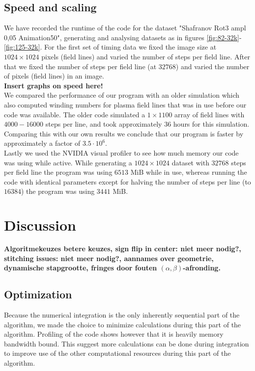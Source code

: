 \documentclass{article}
\begin{document}
\subsection{Speed and scaling}
We have recorded the runtime of the code for the dataset "Shafranov Rot3 ampl 0,05 Animation50", generating and analysing datasets as in figures \ref{fig:82-32k}-\ref{fig:125-32k}. For the first set of timing data we fixed the image size at $1024\times 1024$ pixels (field lines) and varied the number of steps per field line. After that we fixed the number of steps per field line (at $32768$) and varied the number of pixels (field lines) in an image.\\

\textbf{Insert graphs on speed here!}\\

We compared the performance of our program with an older simulation which also computed winding numbers for plasma field lines that was in use before our code was available. The older code simulated a $1\times 1100$ array of field lines with $4000-16000$ steps per line, and took approximately $36$ hours for this simulation. Comparing this with our own results we conclude that our program is faster by approximately a factor of $3.5\cdot 10^6$.\\

Lastly we used the NVIDIA visual profiler to see how much memory our code was using while active. While generating a $1024\times 1024$ dataset with $32768$ steps per field line the program was using $6513$ MiB while in use, whereas running the code with identical parameters except for halving the number of steps per line (to $16384$) the program was using $3441$ MiB.


\section{Discussion}
{\bf Algoritmekeuzes \textrightarrow betere keuzes, sign flip in center: niet meer nodig?, stitching issues: niet meer nodig?, aannames over geometrie, dynamische stapgrootte, fringes door fouten $(\alpha,\beta)$-afronding.}\\

\subsection{Optimization}
Because the numerical integration is the only inherently sequential part of the algorithm, we made the choice to minimize calculations during this part of the algorithm. Profiling of the code shows however that it is heavily memory bandwidth bound. This suggest more calculations can be done during integration to improve use of the other computational resources during this part of the algorithm.\\
\end{document}
